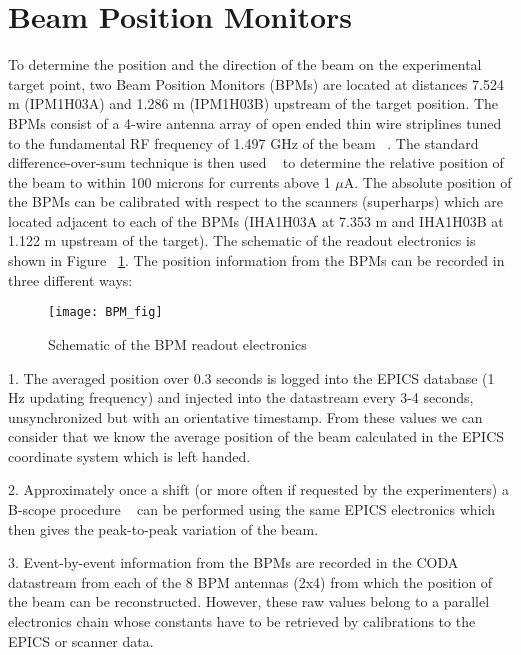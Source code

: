 \section{ Beam Position Monitors}

To determine the position and the direction of the beam on the experimental 
target point, two Beam Position Monitors (BPMs) are located at distances 7.524 m 
(IPM1H03A) and 1.286 m (IPM1H03B) upstream of the target position. 
The BPMs consist of a 4-wire antenna array of open ended thin wire striplines 
tuned to the fundamental RF frequency of 1.497 GHz of the beam ~\cite{bi:bar90}. The 
standard difference-over-sum technique is then used ~\cite{bi:HW} to determine the 
relative position of the beam to within 100 microns for currents
above 1 $\mu $A. The absolute  position of the BPMs can be calibrated with respect to the 
scanners (superharps) which are located adjacent to each of the BPMs (IHA1H03A 
at 7.353 m and IHA1H03B at 1.122 m upstream of the target). The schematic of the 
readout electronics is shown in Figure ~\ref{fig:bpmel}. The
position information from the 
BPMs can be recorded in three different ways:

\begin{figure}
\begin{center}
\texttt{[image: BPM\_fig]}
{\linespread{1.}
\caption[Beamline: BPM Readout Electronics]{Schematic of the BPM readout
electronics}
\label{fig:bpmel}}
\end{center}
\end{figure}

\vskip 0.5cm

1. The averaged position over 0.3 seconds is logged into the EPICS database (1 
Hz updating frequency) and injected into the datastream every 3-4 seconds, 
unsynchronized but with an orientative timestamp. From these values we can 
consider that we know the average position of the beam calculated in the EPICS 
coordinate system which is left handed.

\vskip 0.5cm

2. Approximately once a shift (or more often if requested by the experimenters) 
a B-scope procedure ~\cite{bi:TP} can be performed using the same EPICS electronics 
which then gives the peak-to-peak variation of the beam.

\vskip 0.5cm

3. Event-by-event information from the BPMs are recorded in the CODA datastream
from each of the 8 BPM antennas (2x4) from which the position of the beam can be 
reconstructed. However, these raw values belong to a parallel electronics chain 
whose constants have to be retrieved by calibrations to the EPICS or scanner 
data. 



